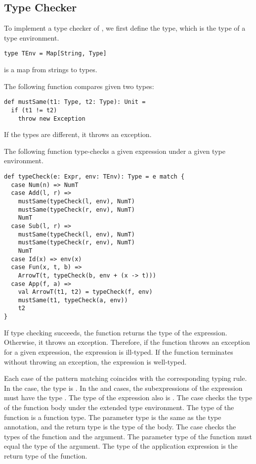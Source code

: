 \subsection{Type Checker}

To implement a type checker of \lang, we first define the  type,
which is the type of a type environment.

\begin{verbatim}
type TEnv = Map[String, Type]
\end{verbatim}

 is a map from strings to \lang types.

The following  function compares given two types:

\begin{verbatim}
def mustSame(t1: Type, t2: Type): Unit =
  if (t1 != t2)
    throw new Exception
\end{verbatim}

If the types are different, it throws an exception.

The following  function type-checks a given expression under a
given type environment.

\begin{verbatim}
def typeCheck(e: Expr, env: TEnv): Type = e match {
  case Num(n) => NumT
  case Add(l, r) =>
    mustSame(typeCheck(l, env), NumT)
    mustSame(typeCheck(r, env), NumT)
    NumT
  case Sub(l, r) =>
    mustSame(typeCheck(l, env), NumT)
    mustSame(typeCheck(r, env), NumT)
    NumT
  case Id(x) => env(x)
  case Fun(x, t, b) =>
    ArrowT(t, typeCheck(b, env + (x -> t)))
  case App(f, a) =>
    val ArrowT(t1, t2) = typeCheck(f, env)
    mustSame(t1, typeCheck(a, env))
    t2
}
\end{verbatim}

If type checking succeeds,
the function returns the type of the expression. Otherwise, it throws an exception.
Therefore, if the function throws an exception for a given expression, the
expression is ill-typed. If the function terminates without throwing an
exception, the expression is well-typed.

Each case of the pattern matching coincides with the corresponding typing rule. In the
 case, the type is . In the  and  cases,
the subexpressions of the expression must have the type . The type of
the expression also is . The  case checks the type of the
function body under the extended type environment. The type of the function is
a function type. The parameter type is the same as the type annotation, and the
return type is the type of the body. The  case
checks the types of the function and the argument. The parameter type of the
function must equal the type of the argument. The type of the application expression
is the return type of the function.


